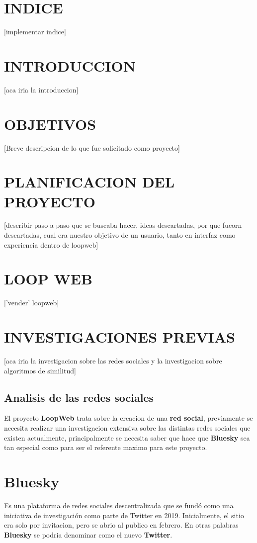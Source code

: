 \section{INDICE}
[implementar indice]
\newpage
\section{INTRODUCCION}
[aca iria la introduccion]
\section{OBJETIVOS}
[Breve descripcion de lo que fue solicitado como proyecto]
\section{PLANIFICACION DEL PROYECTO}
[describir paso a paso que se buscaba hacer, ideas descartadas, por que fueorn descartadas, cual era nuestro objetivo de un usuario, tanto en interfaz como experiencia dentro de loopweb]
\section{LOOP WEB}
['vender' loopweb]
\section{INVESTIGACIONES PREVIAS}
[aca iria la investigacion sobre las redes sociales y la investigacion sobre algoritmos de similitud]
\subsection{{\textbf{Analisis de las redes sociales}}}
El proyecto \textbf{LoopWeb}
trata sobre la creacion de una \textbf{red social}, previamente se necesita realizar una investigacion extensiva sobre las distintas redes sociales que existen actualmente, 
principalmente se necesita saber que hace que \textbf{Bluesky} sea tan especial como para ser el referente maximo para este proyecto.

\section{{\textbf{Bluesky}}}
Es una plataforma de redes sociales descentralizada que se fundó como una iniciativa de investigación como parte de Twitter en 2019. 
Inicialmente, el sitio era solo por invitacion, pero se abrio al publico en febrero.
En otras palabras \textbf{Bluesky} se podria denominar como el nuevo \textbf{Twitter}.

